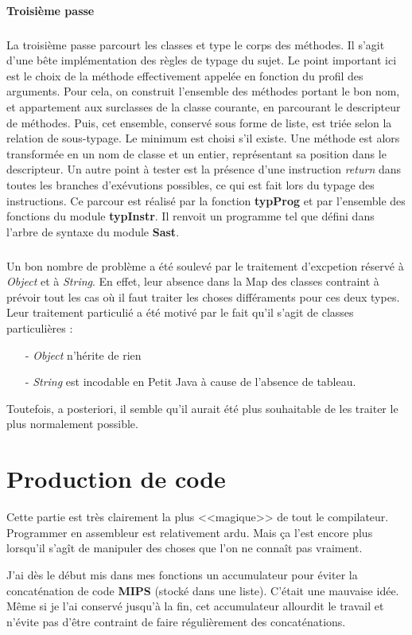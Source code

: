 \documentclass{article}
\begin{document}
\paragraph{Troisième passe}
\subparagraph*{}
La troisième passe parcourt les classes et type le corps des méthodes. Il s'agit d'une bête implémentation des règles de typage du sujet. Le point important ici est le choix de la méthode effectivement appelée en fonction du profil des arguments. Pour cela, on construit l'ensemble des méthodes portant le bon nom, et appartement aux surclasses de la classe courante, en parcourant le descripteur de méthodes. Puis, cet ensemble, conservé sous forme de liste, est triée selon la relation de sous-typage. Le minimum est choisi s'il existe. Une méthode est alors transformée en un nom de classe et un entier, représentant sa position dans le descripteur. Un autre point à tester est la présence d'une instruction \emph{return} dans toutes les branches d'exévutions possibles, ce qui est fait lors du typage des instructions. Ce parcour est réalisé par la fonction \textbf{typProg} et par l'ensemble des fonctions du module \textbf{typInstr}. Il renvoit un programme tel que défini dans l'arbre de syntaxe du module \textbf{Sast}.

\subparagraph*{} Un bon nombre de problème a été soulevé par le traitement d'excpetion réservé à \emph{Object} et à \emph{String}. En effet, leur absence dans la Map des classes contraint à prévoir tout les cas où il faut traiter les choses différaments pour ces deux types. Leur traitement particulié a été motivé par le fait qu'il s'agit de classes particulières : 
\begin{itemize}
\item[-] \emph{Object} n'hérite de rien
\item[-] \emph{String} est incodable en Petit Java à cause de l'absence de tableau.
\end{itemize}
Toutefois, a posteriori, il semble qu'il aurait été plus souhaitable de les traiter le plus normalement possible. 

\section{Production de code}

Cette partie est très clairement la plus <<magique>> de tout le
compilateur. Programmer en assembleur est relativement ardu. Mais ça l'est
encore plus lorsqu'il s'agît de manipuler des choses que l'on ne connaît
pas vraiment.

J'ai dès le début mis dans mes fonctions un accumulateur pour éviter la
concaténation de code \textbf{MIPS} (stocké dans une liste). C'était une
mauvaise idée. Même si je l'ai conservé jusqu'à la fin, cet accumulateur
allourdit le travail et n'évite pas d'être contraint de faire régulièrement des concaténations.
\end{document}
